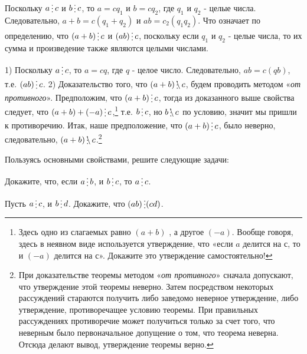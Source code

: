 \begin{dok}
    Поскольку $a\del c$ и $b\del c$, то $a = cq_1$ и $b = cq_2$, где $q_1$ и $q_2$ - целые числа. Следовательно,  $a + b = c(q_1 + q_2)$ и $ab = c_2(q_1q_2)$. Что означает по определению, что $(a + b) \del c$ и $(ab) \del c$, поскольку если    $q_1$ и $q_2$ - целые числа, то их сумма и произведение также являются целыми числами. 
\end{dok}


\begin{dok}
1) Поскольку $a\del c$, то $a = cq$, где $q$ - целое число. Следовательно, $ab = c(qb)$, т.е. $(ab)\del c$. 2) Доказательство того, что $(a + b)\ndel c$, будем проводить методом «\textit{от противного}». Предположим, что $(a + b)\del c$, тогда из доказанного выше свойства следует, что $(a + b) + (-a)\del c$,\footnote{Здесь одно из слагаемых равно $(a + b)$ , а другое $(-a)$. Вообще говоря, здесь в неявном виде используется утверждение, что «если $a$ делится на $с$, то и $(-a)$ делится на $с$». Докажите это утверждение самостоятельно!} т.е. $b\del c$, но $b \ndel c$ по условию, значит мы пришли к противоречию. Итак, наше предположение, что $(a + b)\del c$, было неверно,  следовательно, $(a + b) \ndel c$.\footnote{При доказательстве теоремы методом «\textit{от противного}» сначала допускают, что утверждение этой теоремы неверно. Затем посредством некоторых рассуждений стараются получить либо заведомо неверное утверждение, либо утверждение, противоречащее условию теоремы. При правильных рассуждениях противоречие может получиться только за счет того, что неверным было первоначальное допущение о том, что теорема неверна. Отсюда делают вывод, утверждение теоремы верно.}
\end{dok}

Пользуясь основными свойствами, решите следующие задачи:

\begin{thm}\label{4.1}
	Докажите, что, если $a\del b$, и $b\del c$, то $a\del c$.
\end{thm}

\begin{thm}\label{4.2}
	Пусть $a \del c$, и $b \del d$. Докажите, что $(ab) \del (cd)$.
\end{thm}

